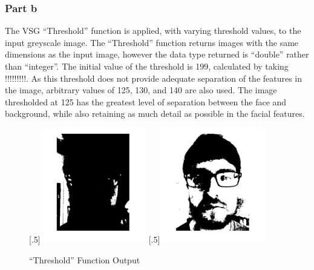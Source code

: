 \documentclass[a4paper]{article}
\begin{document}
	\subsubsection{Part b}
	The VSG ``Threshold'' function is applied, with varying threshold
	values, to the input greyscale image. The ``Threshold'' function returns
	images with the same dimensions as the input image, however the data
	type returned is ``double'' rather than ``integer''. The initial value of the
	threshold is 199, calculated by taking !!!!!!!!!. As this threshold does not
	provide adequate separation of the features in the image, arbitrary
	values of 125, 130, and 140 are also used. The image thresholded at 125
	has the greatest level of separation between the face and background,
	while also retaining as much detail as possible in the facial features.
	\begin{figure}[H]
		\centering
		[.5\linewidth]{\includegraphics[height=5cm]{Results/Q1/b/qbThreshData.jpg}}%
		[.5\linewidth]{\includegraphics[height=5cm]{Results/Q1/b/qbThresh125.jpg}}%
		\caption{``Threshold'' Function Output}
		\label{fig:}
	\end{figure}
\end{document}
